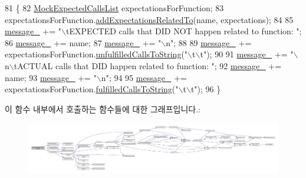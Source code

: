 \begin{DoxyCode}
81 \{
82     \hyperlink{class_mock_expected_calls_list}{MockExpectedCallsList} expectationsForFunction;
83     expectationsForFunction.\hyperlink{class_mock_expected_calls_list_a462f63288f7f9ae4b33d0b5d0eca265e}{addExpectationsRelatedTo}(name, expectations);
84 
85     \hyperlink{class_test_failure_af95aeab689fdb637c3e94b0c10db3e53}{message\_} += \textcolor{stringliteral}{"\(\backslash\)tEXPECTED calls that DID NOT happen related to function: "};
86     \hyperlink{class_test_failure_af95aeab689fdb637c3e94b0c10db3e53}{message\_} += name;
87     \hyperlink{class_test_failure_af95aeab689fdb637c3e94b0c10db3e53}{message\_} += \textcolor{stringliteral}{"\(\backslash\)n"};
88 
89     \hyperlink{class_test_failure_af95aeab689fdb637c3e94b0c10db3e53}{message\_} += expectationsForFunction.\hyperlink{class_mock_expected_calls_list_a81cdcb1eb8447b6835fd9c81df9cfa4e}{unfulfilledCallsToString}(\textcolor{stringliteral}{"\(\backslash\)t\(\backslash\)t"});
90 
91     \hyperlink{class_test_failure_af95aeab689fdb637c3e94b0c10db3e53}{message\_} += \textcolor{stringliteral}{"\(\backslash\)n\(\backslash\)tACTUAL calls that DID happen related to function: "};
92     \hyperlink{class_test_failure_af95aeab689fdb637c3e94b0c10db3e53}{message\_} += name;
93     \hyperlink{class_test_failure_af95aeab689fdb637c3e94b0c10db3e53}{message\_} += \textcolor{stringliteral}{"\(\backslash\)n"};
94 
95     \hyperlink{class_test_failure_af95aeab689fdb637c3e94b0c10db3e53}{message\_} += expectationsForFunction.\hyperlink{class_mock_expected_calls_list_a66959cff61f39f0857b2523e000c1e8c}{fulfilledCallsToString}(\textcolor{stringliteral}{"\(\backslash\)t\(\backslash\)t"});
96 \}
\end{DoxyCode}


이 함수 내부에서 호출하는 함수들에 대한 그래프입니다.\+:
\nopagebreak
\begin{figure}[H]
\begin{center}
\leavevmode
\includegraphics[width=350pt]{class_mock_failure_a24651d311fc939aed3e710afee30edbf_cgraph}
\end{center}
\end{figure}




